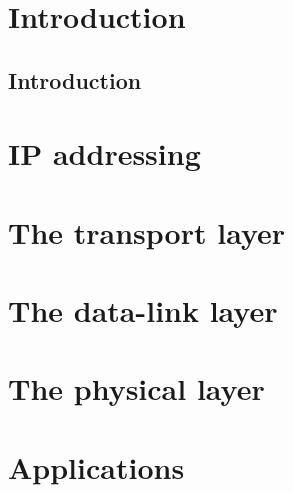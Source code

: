 \documentclass[b5paper,11pt]{memoir}
\begin{document}
\frontmatter
\tableofcontents
\clearforchapter\listoffigures
\clearforchapter\listoftables


\part{Introduction}
\chapter{Introduction}


\mainmatter
\part{IP addressing}














\part{The transport layer}
\label{part:transport-layer}

\part{The data-link layer}




\part{The physical layer}


\part{Applications}



\end{document}
